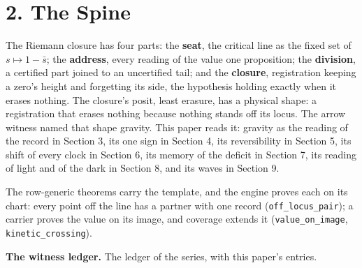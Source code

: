 \documentclass[10pt]{article}
\begin{document}
\hypertarget{the-spine}{%
\section{2. The Spine}\label{the-spine}}

The Riemann closure has four parts: the \textbf{seat}, the critical line
as the fixed set of \(s\mapsto1-\bar s\); the \textbf{address}, every
reading of the value one proposition; the \textbf{division}, a certified
part joined to an uncertified tail; and the \textbf{closure},
registration keeping a zero's height and forgetting its side, the
hypothesis holding exactly when it erases nothing. The closure's posit,
least erasure, has a physical shape: a registration that erases nothing
because nothing stands off its locus. The arrow witness named that shape
gravity. This paper reads it: gravity as the reading of the record in
Section 3, its one sign in Section 4, its reversibility in Section 5,
its shift of every clock in Section 6, its memory of the deficit in
Section 7, its reading of light and of the dark in Section 8, and its
waves in Section 9.

The row-generic theorems carry the template, and the engine proves each
on its chart: every point off the line has a partner with one record
(\texttt{off\_locus\_pair}); a carrier proves the value on its image,
and coverage extends it (\texttt{value\_on\_image},
\texttt{kinetic\_crossing}).

\textbf{The witness ledger.} The ledger of the series, with this paper's
entries.

\begingroup\scriptsize
\end{document}
